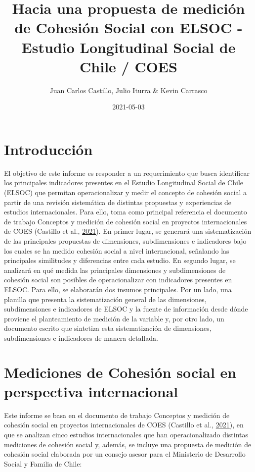 \documentclass[
  12pt,
]{book}
\title{Hacia una propuesta de medición de Cohesión Social con ELSOC - Estudio Longitudinal Social de Chile / COES}
\author{Juan Carlos Castillo, Julio Iturra \& Kevin Carrasco}
\date{2021-05-03}
\begin{document}
\maketitle

{
\hypersetup{linkcolor=}
\setcounter{tocdepth}{1}
\tableofcontents
}
\listoftables
\listoffigures
{}
\hypertarget{introducciuxf3n}{%
\chapter{Introducción}\label{introducciuxf3n}}

El objetivo de este informe es responder a un requerimiento que busca identificar los principales indicadores presentes en el Estudio Longitudinal Social de Chile (ELSOC) que permitan operacionalizar y medir el concepto de cohesión social a partir de una revisión sistemática de distintas propuestas y experiencias de estudios internacionales. Para ello, toma como principal referencia el documento de trabajo Conceptos y medición de cohesión social en proyectos internacionales de COES (Castillo et al., \protect\hyperlink{ref-castillo_Conceptos_2021}{2021}). En primer lugar, se generará una sistematización de las principales propuestas de dimensiones, subdimensiones e indicadores bajo los cuales se ha medido cohesión social a nivel internacional, señalando las principales similitudes y diferencias entre cada estudio. En segundo lugar, se analizará en qué medida las principales dimensiones y subdimensiones de cohesión social son posibles de operacionalizar con indicadores presentes en ELSOC. Para ello, se elaborarán dos insumos principales. Por un lado, una planilla que presenta la sistematización general de las dimensiones, subdimensiones e indicadores de ELSOC y la fuente de información desde dónde proviene el planteamiento de medición de la variable y, por otro lado, un documento escrito que sintetiza esta sistematización de dimensiones, subdimensiones e indicadores de manera detallada.

\hypertarget{mediciones-de-cohesiuxf3n-social-en-perspectiva-internacional}{%
\chapter{Mediciones de Cohesión social en perspectiva internacional}\label{mediciones-de-cohesiuxf3n-social-en-perspectiva-internacional}}

Este informe se basa en el documento de trabajo Conceptos y medición de cohesión social en proyectos internacionales de COES (Castillo et al., \protect\hyperlink{ref-castillo_Conceptos_2021}{2021}), en que se analizan cinco estudios internacionales que han operacionalizado distintas mediciones de cohesión social y, además, se incluye una propuesta de medición de cohesión social elaborada por un consejo asesor para el Ministerio de Desarrollo Social y Familia de Chile:
\end{document}
